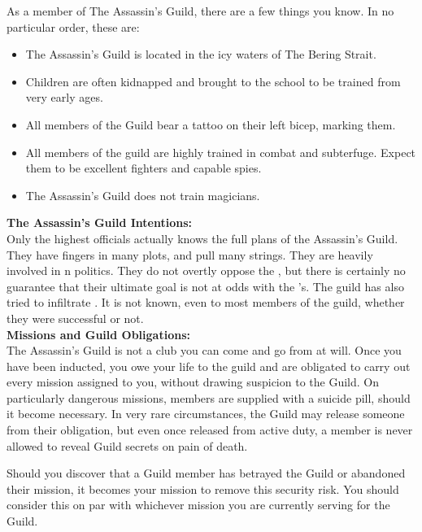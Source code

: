 \documentclass[blue]{NeptuneBall}
\begin{document}
\name{\bAssassin{}}

As a member of The Assassin's Guild, there are a few things you know. In no particular order, these are:

\begin{itemize}
  \item The Assassin's Guild is located in the icy waters of The Bering Strait.
  \item Children are often kidnapped and brought to the school to be trained from very early ages.
  \item All members of the Guild bear a tattoo on their left bicep, marking them.
  \item All members of the guild are highly trained in combat and subterfuge. Expect them to be excellent fighters and capable spies.
  \item The Assassin's Guild does not train magicians.\\
\end{itemize}

{\bf The Assassin's Guild Intentions:}\\
Only the highest officials actually knows the full plans of the Assassin's Guild. They have fingers in many plots, and pull many strings. They are heavily involved in \pPacifica{}n politics.  They do not overtly oppose the \cPacificanRuler{\King}, but there is certainly no guarantee that their ultimate goal is not at odds with the \cPacificanRuler{\King}'s. The guild has also tried to infiltrate \pAtlantis{}. It is not known, even to most members of the guild, whether they were successful or not.\\

{\bf Missions and Guild Obligations:}\\
The Assassin's Guild is not a club you can come and go from at will. Once you have been inducted, you owe your life to the guild and are obligated to carry out every mission assigned to you, without drawing suspicion to the Guild. On particularly dangerous missions, members are supplied with a suicide pill, should it become necessary. In very rare circumstances, the Guild may release someone from their obligation, but even once released from active duty, a member is never allowed to reveal Guild secrets on pain of death.

Should you discover that a Guild member has betrayed the Guild or abandoned their mission, it becomes your mission to remove this security risk. You should consider this on par with whichever mission you are currently serving for the Guild.
\end{document}
